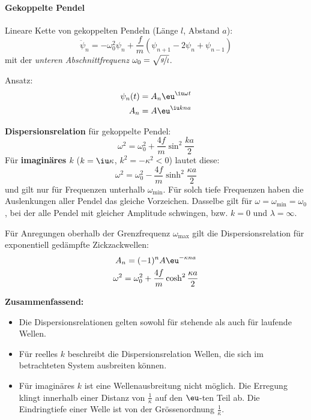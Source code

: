 		\paragraph{Gekoppelte Pendel} %
			Lineare Kette von gekoppelten Pendeln (Länge $l$, Abstand $a$):
			\[
				\ddot \psi_n = -\omega_0^2 \psi_n + \frac{f}{m}(\psi_{n+1} - 2\psi_n + \psi_{n-1})
			\]
			mit der \emph{unteren Abschnittfrequenz} $\omega_0 = \sqrt{\nicefrac gl}$.
			
			Ansatz:
			\begin{align*}
				\psi_n(t) &= A_n \eu^{\iu\omega t} \\
				A_n &= A \eu^{\iu k n a}
			\end{align*}
			
			\textbf{Dispersionsrelation} für gekoppelte Pendel:
			\[
				\omega^2 = \omega_0^2 + \frac{4f}{m} \sin^2 \frac{ka}{2}
			\]
			Für \textbf{imaginäres $k$} ($k = \iu\kappa$, $k^2 = -\kappa^2 < 0$) lautet diese:
			\[
				\omega^2 = \omega_0^2 - \frac{4f}{m} \sinh^2 \frac{\kappa a}{2}
			\]
			und gilt nur für Frequenzen unterhalb $\omega_\text{min}$. Für solch tiefe Frequenzen haben die Auslenkungen aller Pendel das gleiche Vorzeichen. Dasselbe gilt für $\omega = \omega_\text{min} = \omega_0$, bei der alle Pendel mit gleicher Amplitude schwingen, bzw. $k = 0$ und $\lambda = \infty$.
			
			Für Anregungen oberhalb der Grenzfrequenz $\omega_\text{max}$ gilt die Dispersionsrelation für exponentiell gedämpfte Zickzackwellen:
			\begin{gather*}
				A_n = (-1)^n A \eu^{-\kappa n a} \\
				\omega^2 = \omega_0^2 + \frac{4f}{m}\cosh^2 \frac{\kappa a}{2}
			\end{gather*}
			
			\textbf{Zusammenfassend:}
			\begin{itemize}
				\item Die Dispersionsrelationen gelten sowohl für stehende als auch für laufende Wellen.
				\item Für reelles $k$ beschreibt die Dispersionsrelation Wellen, die sich im betrachteten System ausbreiten können.
				\item Für imaginäres $k$ ist eine Wellenausbreitung nicht möglich. Die Erregung klingt innerhalb einer Distanz von $\frac 1 \kappa$ auf den $\eu$-ten Teil ab. Die Eindringtiefe einer Welle ist von der Grössenordnung $\frac 1 \kappa$.
			\end{itemize}
